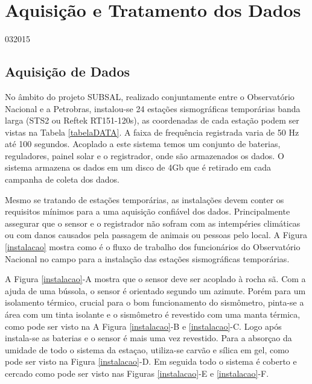 \chapter{Aquisição e Tratamento dos Dados}
\date{24}{03}{2015}
\section{Aquisição de Dados}

No âmbito do projeto SUBSAL, realizado conjuntamente entre o Observatório Nacional e a Petrobras,  instalou-se 24 estações sismográficas temporárias banda larga (STS2 ou Reftek RT151-120s), as coordenadas de cada estação podem ser vistas na Tabela \ref{tabelaDATA}. A faixa de frequência registrada varia de 50 Hz até 100 segundos. Acoplado a este sistema temos um conjunto de baterias, reguladores, painel solar e o registrador, onde são armazenados os dados. O sistema armazena os dados em um disco de 4Gb que é retirado em cada campanha de coleta dos dados.

Mesmo se tratando de estações temporárias, as instalações devem conter os requisitos mínimos para a uma aquisição confiável dos dados. Principalmente assegurar que o sensor e o registrador não sofram com as intempéries climáticas ou com danos causados pela passagem de animais ou pessoas pelo local. A Figura \ref{instalacao} mostra como é o fluxo de trabalho dos funcionários do Observatório Nacional no campo para a instalação das estações sismográficas temporárias. 

A Figura \ref{instalacao}-A mostra que o sensor deve ser acoplado à rocha sã. Com a ajuda de uma bússola, o sensor é orientado segundo um azimute.  Porém para um isolamento térmico, crucial para o bom funcionamento do sismômetro, pinta-se a área com um tinta isolante e o sismômetro é revestido com uma manta térmica, como pode ser visto na A Figura \ref{instalacao}-B e \ref{instalacao}-C. Logo após instala-se as baterias e o sensor é mais uma vez revestido. Para a absorçao da umidade de todo o sistema da estaçao, utiliza-se carvão e sílica em gel, como pode ser visto na Figura \ref{instalacao}-D. Em seguida todo o sistema é coberto e cercado como pode ser visto nas Figuras \ref{instalacao}-E e \ref{instalacao}-F.	  

